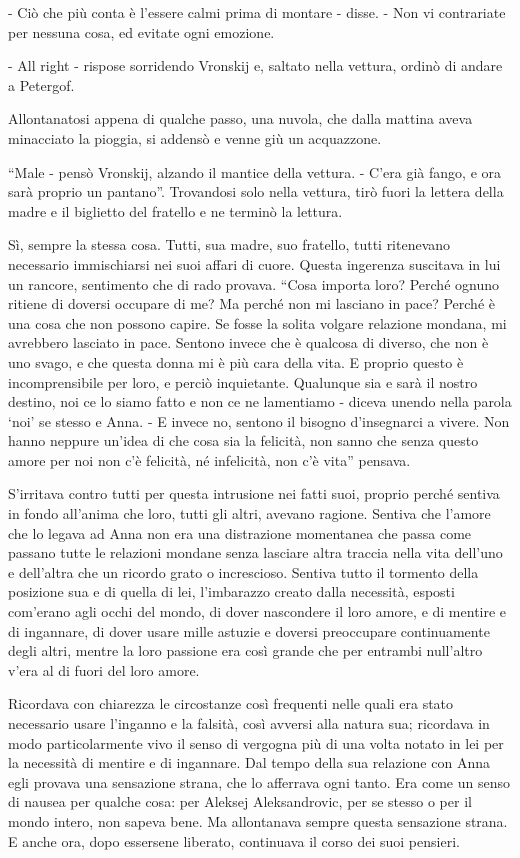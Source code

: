 - Ciò che più conta è l'essere calmi prima di montare - disse. - Non vi contrariate per nessuna cosa, ed evitate ogni emozione. 

- All right - rispose sorridendo Vronskij e, saltato nella vettura, ordinò di andare a Petergof. 

Allontanatosi appena di qualche passo, una nuvola, che dalla mattina aveva minacciato la pioggia, si addensò e venne giù un acquazzone. 

``Male - pensò Vronskij, alzando il mantice della vettura. - C'era già fango, e ora sarà proprio un pantano''. Trovandosi solo nella vettura, tirò fuori la lettera della madre e il biglietto del fratello e ne terminò la lettura. 

Sì, sempre la stessa cosa. Tutti, sua madre, suo fratello, tutti ritenevano necessario immischiarsi nei suoi affari di cuore. Questa ingerenza suscitava in lui un rancore, sentimento che di rado provava. ``Cosa importa loro? Perché ognuno ritiene di doversi occupare di me? Ma perché non mi lasciano in pace? Perché è una cosa che non possono capire. Se fosse la solita volgare relazione mondana, mi avrebbero lasciato in pace. Sentono invece che è qualcosa di diverso, che non è uno svago, e che questa donna mi è più cara della vita. E proprio questo è incomprensibile per loro, e perciò inquietante. Qualunque sia e sarà il nostro destino, noi ce lo siamo fatto e non ce ne lamentiamo - diceva unendo nella parola `noi' se stesso e Anna. - E invece no, sentono il bisogno d'insegnarci a vivere. Non hanno neppure un'idea di che cosa sia la felicità, non sanno che senza questo amore per noi non c'è felicità, né infelicità, non c'è vita'' pensava. 

S'irritava contro tutti per questa intrusione nei fatti suoi, proprio perché sentiva in fondo all'anima che loro, tutti gli altri, avevano ragione. Sentiva che l'amore che lo legava ad Anna non era una distrazione momentanea che passa come passano tutte le relazioni mondane senza lasciare altra traccia nella vita dell'uno e dell'altra che un ricordo grato o increscioso. Sentiva tutto il tormento della posizione sua e di quella di lei, l'imbarazzo creato dalla necessità, esposti com'erano agli occhi del mondo, di dover nascondere il loro amore, e di mentire e di ingannare, di dover usare mille astuzie e doversi preoccupare continuamente degli altri, mentre la loro passione era così grande che per entrambi null'altro v'era al di fuori del loro amore. 

Ricordava con chiarezza le circostanze così frequenti nelle quali era stato necessario usare l'inganno e la falsità, così avversi alla natura sua; ricordava in modo particolarmente vivo il senso di vergogna più di una volta notato in lei per la necessità di mentire e di ingannare. Dal tempo della sua relazione con Anna egli provava una sensazione strana, che lo afferrava ogni tanto. Era come un senso di nausea per qualche cosa: per Aleksej Aleksandrovic, per se stesso o per il mondo intero, non sapeva bene. Ma allontanava sempre questa sensazione strana. E anche ora, dopo essersene liberato, continuava il corso dei suoi pensieri. 

